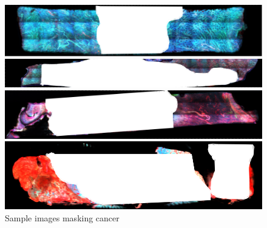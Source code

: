\begin{figure}[H]
	\centering
	
	\begin{minipage}{0.8\columnwidth}
		\centering
		\includegraphics[clip, width=\linewidth]{fig/raw_data/label/C-013}
	\end{minipage}	
	
	\begin{minipage}{0.8\columnwidth}
		\centering
		\includegraphics[clip, width=\linewidth]{fig/raw_data/label/C-012}
	\end{minipage}
	
	\begin{minipage}{0.8\columnwidth}
		\centering
		\includegraphics[clip, width=\linewidth]{fig/raw_data/label/C-009}
	\end{minipage}
	
	\begin{minipage}{0.8\columnwidth}
		\centering
		\includegraphics[clip, width=\linewidth]{fig/raw_data/label/C-011}
	\end{minipage}
	
	\caption{Sample images masking cancer}
	\label{fig:コラ画像}
	
\end{figure}


